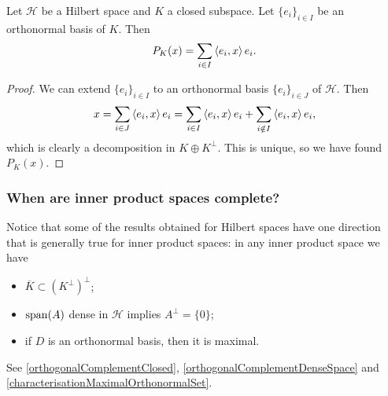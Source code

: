 \begin{lemma} \label{sumExpansionOrthogonalProjector}
Let $\mathcal{H}$ be a Hilbert space and $K$ a closed subspace. Let $\{e_i\}_{i\in I}$ be an orthonormal basis of $K$. Then
\[ P_K(x) = \sum_{i\in I} \left\langle e_i,x \right\rangle e_i. \]
\end{lemma}
\begin{proof}
We can extend $\{e_i\}_{i\in I}$ to an orthonormal basis $\{e_i\}_{i\in J}$ of $\mathcal{H}$. Then
\[ x = \sum_{i\in J}\left\langle e_i,x \right\rangle e_i = \sum_{i\in I}\left\langle e_i,x \right\rangle e_i + \sum_{i\notin I}\left\langle e_i,x \right\rangle e_i, \]
which is clearly a decomposition in $K\oplus K^\perp$. This is unique, so we have found $P_K(x)$.
\end{proof}

\subsubsection{When are inner product spaces complete?}
Notice that some of the results obtained for Hilbert spaces have one direction that is generally true for inner product spaces: in any inner product space we have
\begin{itemize}
\item $\overline{K}\subset (K^\perp)^\perp$;
\item $\operatorname{span}(A)$ dense in $\mathcal{H}$ implies $A^\perp = \{0\}$;
\item if $D$ is an orthonormal basis, then it is maximal.
\end{itemize}
See \ref{orthogonalComplementClosed}, \ref{orthogonalComplementDenseSpace} and \ref{characterisationMaximalOrthonormalSet}.

